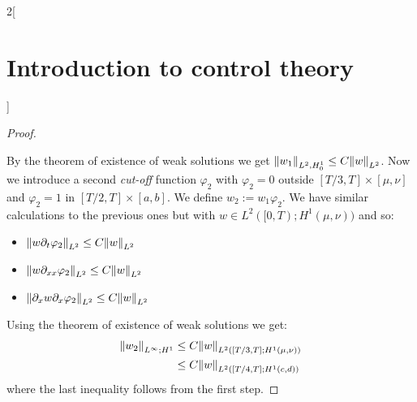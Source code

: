 \documentclass[../../../main_math.tex]{subfiles}
\begin{document}
\begin{multicols}{2}[\section{Introduction to control theory}]
\begin{proof}
\begin{itemize}
    \end{itemize}
    By the theorem of existence of weak solutions we get $\norm{w_1}_{L^2,H_0^1}\leq C\norm{w}_{L^2}$. Now we introduce a second \textit{cut-off} function $\varphi_2$ with $\varphi_2=0$ outside $[T/3,T]\times [\mu,\nu]$ and $\varphi_2=1$ in $[T/2,T]\times [a,b]$. We define $w_2:=w_1\varphi_2$. We have similar calculations to the previous ones but with $w\in L^2([0,T); H^1(\mu,\nu))$ and so:
    \begin{itemize}
      \item $\norm{w\partial_t\varphi_2}_{L^2}\leq C \norm{w}_{L^2}$
      \item $\norm{w\partial_{xx}\varphi_2}_{L^2}\leq C \norm{w}_{L^2}$
      \item $\norm{\partial_x w\partial_x\varphi_2}_{L^2}\leq C \norm{w}_{L^2}$
    \end{itemize}
    Using the theorem of existence of weak solutions we get:
    \begin{align*}
      \norm{w_2}_{L^\infty;H^1} & \leq C\norm{w}_{L^2([T/3,T]; H^1(\mu,\nu))} \\
                                & \leq C\norm{w}_{L^2([T/4,T]; H^1(c,d))}
    \end{align*}
    where the last inequality follows from the first step.
  \end{proof}

\end{multicols}
\end{document}
